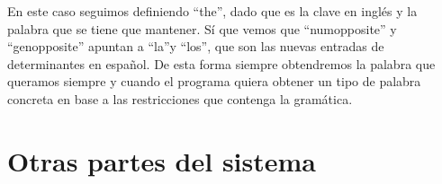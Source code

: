 En este caso seguimos definiendo ``the'', dado que es la clave en inglés y la palabra que se tiene que mantener. Sí que vemos que ``numopposite'' y ``genopposite'' apuntan a ``la''y ``los'', que son las nuevas entradas de determinantes en español. De esta forma siempre obtendremos la palabra que queramos siempre y cuando el programa quiera obtener un tipo de palabra concreta en base a las restricciones que contenga la gramática.

\section{Otras partes del sistema}